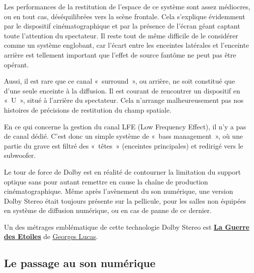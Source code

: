 \documentclass[
  letterpaper,
  DIV=11,
  numbers=noendperiod]{scrreprt}
\begin{document}
Les performances de la restitution de l'espace de ce système sont assez
médiocres, ou en tout cas, déséquilibrées vers la scène frontale. Cela
s'explique évidemment par le dispositif cinématographique et par la
présence de l'écran géant captant toute l'attention du spectateur. Il
reste tout de même difficile de le considérer comme un système
englobant, car l'écart entre les enceintes latérales et l'enceinte
arrière est tellement important que l'effet de source fantôme ne peut
pas être opérant.

Aussi, il est rare que ce canal «~surround~», ou arrière, ne soit
constitué que d'une seule enceinte à la diffusion. Il est courant de
rencontrer un dispositif en «~U~», situé à l'arrière du spectateur. Cela
n'arrange malheureusement pas nos histoires de précisions de restitution
du champ spatiale.

\begin{tcolorbox}[enhanced jigsaw, leftrule=.75mm, arc=.35mm, bottomtitle=1mm, colback=white, colbacktitle=quarto-callout-important-color!10!white, opacityback=0, left=2mm, rightrule=.15mm, opacitybacktitle=0.6, breakable, toptitle=1mm, titlerule=0mm, bottomrule=.15mm, toprule=.15mm, coltitle=black, title=\textcolor{quarto-callout-important-color}{\faExclamation}\hspace{0.5em}{Important}]

En ce qui concerne la gestion du canal LFE (Low Frequency Effect), il
n'y a pas de canal dédié. C'est donc un simple système de «~bass
management~», où une partie du grave est filtré des «~têtes~» (enceintes
principales) et redirigé vers le subwoofer.

\end{tcolorbox}

Le tour de force de Dolby est en réalité de contourner la limitation du
support optique sans pour autant remettre en cause la chaîne de
production cinématographique. Même après l'avènement du son numérique,
une version Dolby Stereo était toujours présente sur la pellicule, pour
les salles non équipées en système de diffusion numérique, ou en cas de
panne de ce dernier.

Un des métrages emblématique de cette technologie Dolby Stereo est
\textbf{\href{https://fr.wikipedia.org/wiki/Star_Wars,_\%C3\%A9pisode_IV_:_Un_nouvel_espoir}{La
Guerre des Etoiles}} de
\href{https://fr.wikipedia.org/wiki/George_Lucas}{Georges Lucas}.

\hypertarget{le-passage-au-son-numuxe9rique}{%
\subsection{Le passage au son
numérique}\label{le-passage-au-son-numuxe9rique}}
\end{document}
